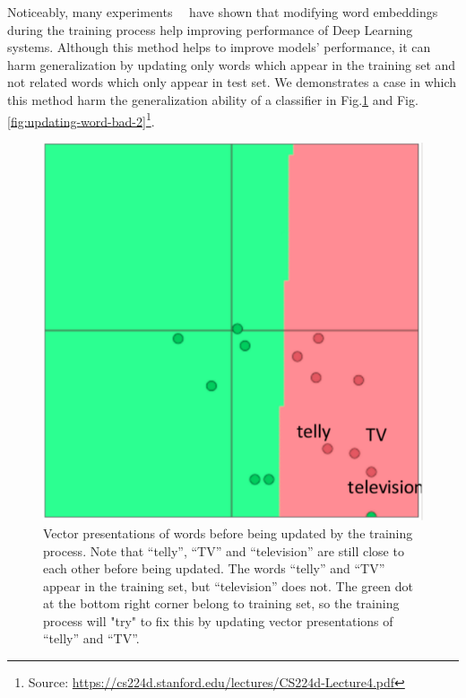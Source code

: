 Noticeably, many experiments~\cite{treeLSTM}~\cite{KimCNN} have shown that modifying word embeddings during the training process help improving performance of Deep Learning systems.
Although this method helps to improve models' performance, it can harm generalization by updating only words which appear in the training set and not related words which only appear in test set.
We demonstrates a case in which this method harm the generalization ability of a classifier in Fig.\ref{fig:updating-word-bad-1} and Fig.\ref{fig:updating-word-bad-2}\footnote{Source: \url{https://cs224d.stanford.edu/lectures/CS224d-Lecture4.pdf}}.


\begin{figure}[H]
    \centering
    \includegraphics[scale=0.35]{figure/vec-before-update}
    \caption[Word embeddings updating causing over-fitting 1]{Vector presentations of words before being updated by the training process.
    Note that ``telly'', ``TV'' and ``television'' are still close to each other before being updated.
    The words ``telly'' and ``TV'' appear in the training set, but ``television'' does not.
    The green dot at the bottom right corner belong to training set, so the training process will "try" to fix this by updating vector presentations of ``telly'' and ``TV''.
     }
    \label{fig:updating-word-bad-1}
\end{figure}

